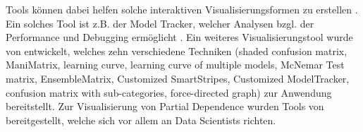 Tools können dabei helfen solche interaktiven Visualisierungsformen zu erstellen \cite{zhou20182d}. Ein solches Tool ist z.B. der Model Tracker, welcher Analysen bzgl. der Performance und Debugging ermöglicht \cite{amershi2015modeltracker}. Ein weiteres Visualisierungstool wurde von \cite{chen2016diagnostic} entwickelt, welches zehn verschiedene Techniken (shaded confusion matrix, ManiMatrix, learning curve, learning curve of multiple models, McNemar Test matrix, EnsembleMatrix, Customized SmartStripes, Customized ModelTracker, confusion matrix with sub-categories, force-directed graph)  zur Anwendung bereitstellt. Zur Visualisierung von Partial Dependence wurden Tools von \cite{krause2016interacting} bereitgestellt, welche sich vor allem an Data Scientists richten.

